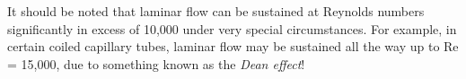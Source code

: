 It should be noted that laminar flow can be sustained at Reynolds numbers significantly in excess of 10,000 under very special circumstances.  For example, in certain coiled capillary tubes, laminar flow may be sustained all the way up to Re = 15,000, due to something known as the {\it Dean effect}!











